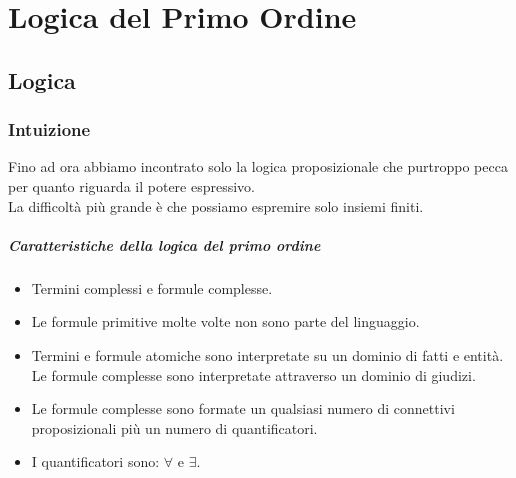 \documentclass[../main.tex]{subfiles}
\begin{document}
   \part{Logica del Primo Ordine}

   \chapter{Logica}

   \section{Intuizione}
   Fino ad ora abbiamo incontrato solo la logica proposizionale che purtroppo pecca per quanto riguarda il potere espressivo.\\
   La difficoltà più grande è che possiamo espremire solo insiemi finiti.\\

   \subsubsection{Caratteristiche della logica del primo ordine}
   \begin{itemize}
      \item Termini complessi e formule complesse.
      \item Le formule primitive molte volte non sono parte del linguaggio.
      \item Termini e formule atomiche sono interpretate su un dominio di fatti e entità.\\
         Le formule complesse sono interpretate attraverso un dominio di giudizi.
      \item Le formule complesse sono formate un qualsiasi numero di connettivi proposizionali più un numero di quantificatori.
      \item I quantificatori sono: $\forall$ e $\exists$.
   \end{itemize}
\end{document}
